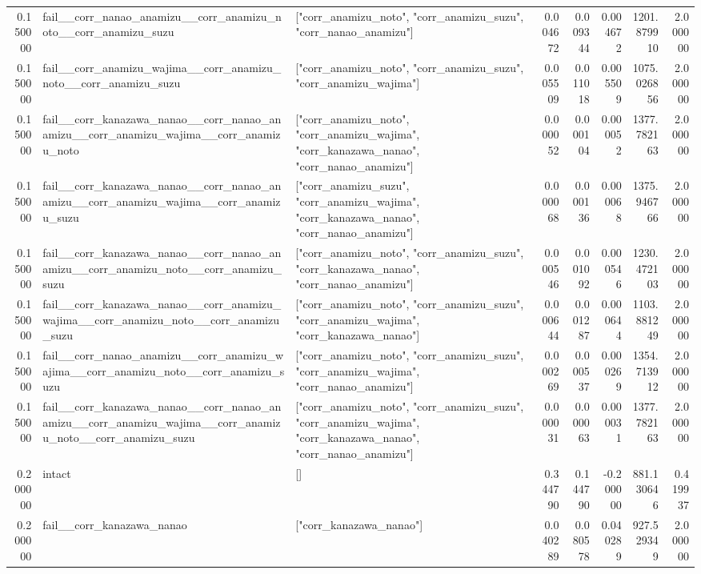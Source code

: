 \begin{tabular}{rllrrrrr}
0.150000 & fail\_\_corr\_nanao\_anamizu\_\_corr\_anamizu\_noto\_\_corr\_anamizu\_suzu & ["corr\_anamizu\_noto", "corr\_anamizu\_suzu", "corr\_nanao\_anamizu"] & 0.004672 & 0.009344 & 0.004672 & 1201.879910 & 2.000000 \\
0.150000 & fail\_\_corr\_anamizu\_wajima\_\_corr\_anamizu\_noto\_\_corr\_anamizu\_suzu & ["corr\_anamizu\_noto", "corr\_anamizu\_suzu", "corr\_anamizu\_wajima"] & 0.005509 & 0.011018 & 0.005509 & 1075.026856 & 2.000000 \\
0.150000 & fail\_\_corr\_kanazawa\_nanao\_\_corr\_nanao\_anamizu\_\_corr\_anamizu\_wajima\_\_corr\_anamizu\_noto & ["corr\_anamizu\_noto", "corr\_anamizu\_wajima", "corr\_kanazawa\_nanao", "corr\_nanao\_anamizu"] & 0.000052 & 0.000104 & 0.000052 & 1377.782163 & 2.000000 \\
0.150000 & fail\_\_corr\_kanazawa\_nanao\_\_corr\_nanao\_anamizu\_\_corr\_anamizu\_wajima\_\_corr\_anamizu\_suzu & ["corr\_anamizu\_suzu", "corr\_anamizu\_wajima", "corr\_kanazawa\_nanao", "corr\_nanao\_anamizu"] & 0.000068 & 0.000136 & 0.000068 & 1375.946766 & 2.000000 \\
0.150000 & fail\_\_corr\_kanazawa\_nanao\_\_corr\_nanao\_anamizu\_\_corr\_anamizu\_noto\_\_corr\_anamizu\_suzu & ["corr\_anamizu\_noto", "corr\_anamizu\_suzu", "corr\_kanazawa\_nanao", "corr\_nanao\_anamizu"] & 0.000546 & 0.001092 & 0.000546 & 1230.472103 & 2.000000 \\
0.150000 & fail\_\_corr\_kanazawa\_nanao\_\_corr\_anamizu\_wajima\_\_corr\_anamizu\_noto\_\_corr\_anamizu\_suzu & ["corr\_anamizu\_noto", "corr\_anamizu\_suzu", "corr\_anamizu\_wajima", "corr\_kanazawa\_nanao"] & 0.000644 & 0.001287 & 0.000644 & 1103.881249 & 2.000000 \\
0.150000 & fail\_\_corr\_nanao\_anamizu\_\_corr\_anamizu\_wajima\_\_corr\_anamizu\_noto\_\_corr\_anamizu\_suzu & ["corr\_anamizu\_noto", "corr\_anamizu\_suzu", "corr\_anamizu\_wajima", "corr\_nanao\_anamizu"] & 0.000269 & 0.000537 & 0.000269 & 1354.713912 & 2.000000 \\
0.150000 & fail\_\_corr\_kanazawa\_nanao\_\_corr\_nanao\_anamizu\_\_corr\_anamizu\_wajima\_\_corr\_anamizu\_noto\_\_corr\_anamizu\_suzu & ["corr\_anamizu\_noto", "corr\_anamizu\_suzu", "corr\_anamizu\_wajima", "corr\_kanazawa\_nanao", "corr\_nanao\_anamizu"] & 0.000031 & 0.000063 & 0.000031 & 1377.782163 & 2.000000 \\
0.200000 & intact & [] & 0.344790 & 0.144790 & -0.200000 & 881.130646 & 0.419937 \\
0.200000 & fail\_\_corr\_kanazawa\_nanao & ["corr\_kanazawa\_nanao"] & 0.040289 & 0.080578 & 0.040289 & 927.529349 & 2.000000 \\

\end{tabular}
